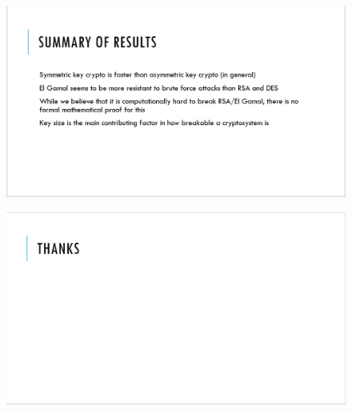 \documentclass[12pt]{report}
\begin{document}
\begin{figure}[hp!] %
    \begin{center}
        \includegraphics[width=0.85\linewidth]{Pictures/slide11.PNG}
        \label{fig:slide11}
    \end{center}
\end{figure}

\begin{figure}[hp!] %
    \begin{center}
        \includegraphics[width=0.85\linewidth]{Pictures/slide12.PNG}
        \label{fig:slide12}
    \end{center}
\end{figure}
\end{document}
